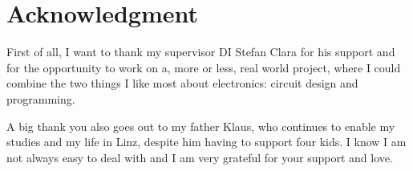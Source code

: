 \chapter{Acknowledgment}

First of all, I want to thank my supervisor DI Stefan Clara for his support and for the opportunity to work on a, more
or less, real world project, where I could combine the two things I like most about electronics: circuit design and
programming.

A big thank you also goes out to my father Klaus, who continues to enable my studies and my life in Linz, despite
him having to support four kids.
I know I am not always easy to deal with and I am very grateful for your support and love.
